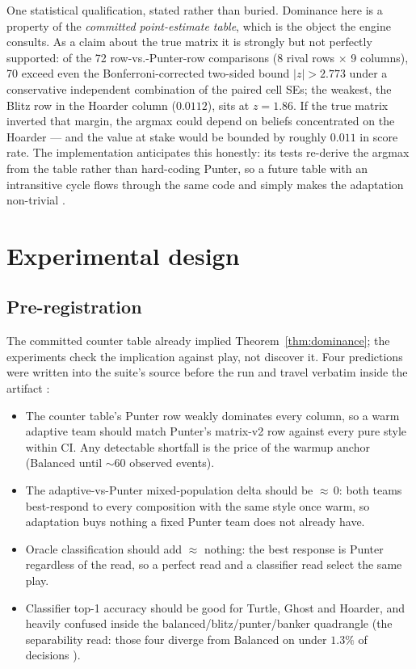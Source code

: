 \documentclass[11pt]{article}
\begin{document}
One statistical qualification, stated rather than buried. Dominance here is a property of
the \emph{committed point-estimate table}, which is the object the engine consults. As a
claim about the true matrix it is strongly but not perfectly supported: of the 72
row-vs.-Punter-row comparisons (8 rival rows $\times$ 9 columns), 70 exceed even the
Bonferroni-corrected two-sided bound $|z| > 2.773$ under a conservative independent
combination of the paired cell SEs; the weakest, the Blitz row in the Hoarder column
($0.0112$), sits at $z = 1.86$. If the true matrix inverted that margin, the argmax could
depend on beliefs concentrated on the Hoarder --- and the value at stake would be bounded
by roughly $0.011$ in score rate. The implementation anticipates this honestly: its tests
re-derive the argmax from the table rather than hard-coding Punter, so a future table with
an intransitive cycle flows through the same code and simply makes the adaptation
non-trivial \cite{repo}.

\section{Experimental design}
\label{sec:design}

\subsection{Pre-registration}
\label{sec:prereg}

The committed counter table already implied Theorem~\ref{thm:dominance}; the experiments
check the implication against play, not discover it. Four predictions were written into
the suite's source before the run and travel verbatim inside the artifact \cite{artifact}:

\begin{itemize}
\item[\textbf{P1}] The counter table's Punter row weakly dominates every column, so a warm
  adaptive team should match Punter's matrix-v2 row against every pure style within CI.
  Any detectable shortfall is the price of the warmup anchor (Balanced until ${\sim}60$
  observed events).
\item[\textbf{P2}] The adaptive-vs-Punter mixed-population delta should be ${\approx}\,0$:
  both teams best-respond to every composition with the same style once warm, so
  adaptation buys nothing a fixed Punter team does not already have.
\item[\textbf{P3}] Oracle classification should add ${\approx}$ nothing: the best response
  is Punter regardless of the read, so a perfect read and a classifier read select the
  same play.
\item[\textbf{P4}] Classifier top-1 accuracy should be good for Turtle, Ghost and Hoarder,
  and heavily confused inside the balanced/blitz/punter/banker quadrangle (the
  separability read: those four diverge from Balanced on under $1.3\%$ of decisions
  \cite{styles}).
\end{itemize}
\end{document}
